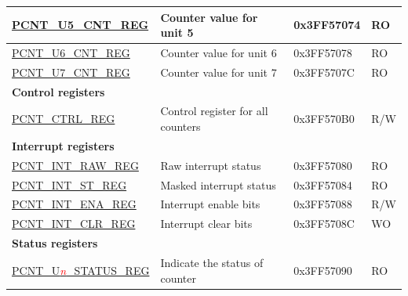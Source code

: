 \begin{longtable}{ | p{5cm} | p{7cm} | p{2cm} | p{1cm} | }
\hyperref[regdesc:PCNTUnCNTREG]{PCNT\_U5\_CNT\_REG} & Counter value for unit 5 & 0x3FF57074 & RO \\ \hline
\hyperref[regdesc:PCNTUnCNTREG]{PCNT\_U6\_CNT\_REG} & Counter value for unit 6 & 0x3FF57078 & RO \\ \hline
\hyperref[regdesc:PCNTUnCNTREG]{PCNT\_U7\_CNT\_REG} & Counter value for unit 7 & 0x3FF5707C & RO \\ \hline
\multicolumn{4}{|l|}{\textbf{Control registers}} \\ \hline
\hyperref[regdesc:PCNTCTRLREG]{PCNT\_CTRL\_REG} & Control register for all counters & 0x3FF570B0 & R/W \\ \hline
\multicolumn{4}{|l|}{\textbf{Interrupt registers}} \\ \hline
\hyperref[regdesc:PCNTINTRAWREG]{PCNT\_INT\_RAW\_REG} & Raw interrupt status & 0x3FF57080 & RO \\ \hline
\hyperref[regdesc:PCNTINTSTREG]{PCNT\_INT\_ST\_REG} & Masked interrupt status & 0x3FF57084 & RO \\ \hline
\hyperref[regdesc:PCNTINTENAREG]{PCNT\_INT\_ENA\_REG} & Interrupt enable bits & 0x3FF57088 & R/W \\ \hline
\hyperref[regdesc:PCNTINTCLRREG]{PCNT\_INT\_CLR\_REG} & Interrupt clear bits & 0x3FF5708C & WO \\ \hline

\multicolumn{4}{|l|}{\textbf{Status registers}} \\ \hline
\hyperref[regdesc:PCNTUnSTATUSREG]{PCNT\_U\textcolor{red}{\it{n}}\_STATUS\_REG} & Indicate the status of counter & 0x3FF57090 & RO  \\ \hline
\end{longtable}

